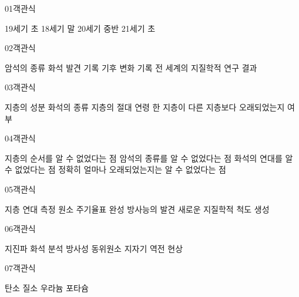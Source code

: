 \documentclass[fs9,seriesRus]{korfarm-base}
\begin{document}
\par\medskip
\kfBeginMC
\begin{kfQBlock}{01}{객관식}
\begin{kfChoices}
\kfChoice 19세기 초
\kfChoice 18세기 말
\kfChoice 20세기 중반
\kfChoice 21세기 초
\end{kfChoices}
\end{kfQBlock}
\begin{kfQBlock}{02}{객관식}
\begin{kfChoices}
\kfChoice 암석의 종류
\kfChoice 화석 발견 기록
\kfChoice 기후 변화 기록
\kfChoice 전 세계의 지질학적 연구 결과
\end{kfChoices}
\end{kfQBlock}
\begin{kfQBlock}{03}{객관식}
\begin{kfChoices}
\kfChoice 지층의 성분
\kfChoice 화석의 종류
\kfChoice 지층의 절대 연령
\kfChoice 한 지층이 다른 지층보다 오래되었는지 여부
\end{kfChoices}
\end{kfQBlock}
\begin{kfQBlock}{04}{객관식}
\begin{kfChoices}
\kfChoice 지층의 순서를 알 수 없었다는 점
\kfChoice 암석의 종류를 알 수 없었다는 점
\kfChoice 화석의 연대를 알 수 없었다는 점
\kfChoice 정확히 얼마나 오래되었는지는 알 수 없었다는 점
\end{kfChoices}
\end{kfQBlock}
\begin{kfQBlock}{05}{객관식}
\begin{kfChoices}
\kfChoice 지층 연대 측정
\kfChoice 원소 주기율표 완성
\kfChoice 방사능의 발견
\kfChoice 새로운 지질학적 척도 생성
\end{kfChoices}
\end{kfQBlock}
\begin{kfQBlock}{06}{객관식}
\begin{kfChoices}
\kfChoice 지진파
\kfChoice 화석 분석
\kfChoice 방사성 동위원소
\kfChoice 지자기 역전 현상
\end{kfChoices}
\end{kfQBlock}
\begin{kfQBlock}{07}{객관식}
\begin{kfChoices}
\kfChoice 탄소
\kfChoice 질소
\kfChoice 우라늄
\kfChoice 포타슘
\end{kfChoices}
\end{kfQBlock}
\end{document}
